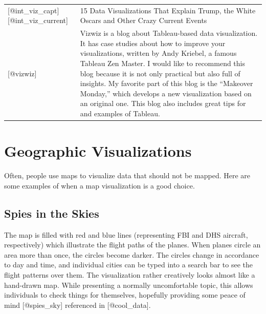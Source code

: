 \documentclass[]{book}
\theoremstyle{definition}
\theoremstyle{definition}
\theoremstyle{definition}
\theoremstyle{remark}
\begin{document}
\begin{longtable}[]{@{}ll@{}}
\begin{minipage}[t]{0.15\columnwidth}\raggedright\strut
{[}@int\_viz\_capt{]}{[}@int\_viz\_current{]}\strut
\end{minipage} & \begin{minipage}[t]{0.79\columnwidth}\raggedright\strut
15 Data Visualizations That Explain Trump, the White Oscars and Other
Crazy Current Events\strut
\end{minipage}\tabularnewline
\begin{minipage}[t]{0.15\columnwidth}\raggedright\strut
{[}@vizwiz{]}\strut
\end{minipage} & \begin{minipage}[t]{0.79\columnwidth}\raggedright\strut
Vizwiz is a blog about Tableau-based data visualization. It has case
studies about how to improve your visualizations, written by Andy
Kriebel, a famous Tableau Zen Master. I would like to recommend this
blog because it is not only practical but also full of insights. My
favorite part of this blog is the ``Makeover Monday,'' which develops a
new visualization based on an original one. This blog also includes
great tips for and examples of Tableau.\strut
\end{minipage}\tabularnewline
\bottomrule
\end{longtable}

\section{Geographic Visualizations}\label{geographic-visualizations}

Often, people use maps to visualize data that should not be mapped. Here
are some examples of when a map visualization is a good choice.

\subsection{Spies in the Skies}\label{spies-in-the-skies}

The map is filled with red and blue lines (representing FBI and DHS
aircraft, respectively) which illustrate the flight paths of the planes.
When planes circle an area more than once, the circles become darker.
The circles change in accordance to day and time, and individual cities
can be typed into a search bar to see the flight patterns over them. The
visualization rather creatively looks almost like a hand-drawn map.
While presenting a normally uncomfortable topic, this allows individuals
to check things for themselves, hopefully providing some peace of mind
{[}@spies\_sky{]} referenced in {[}@cool\_data{]}.
\end{document}

